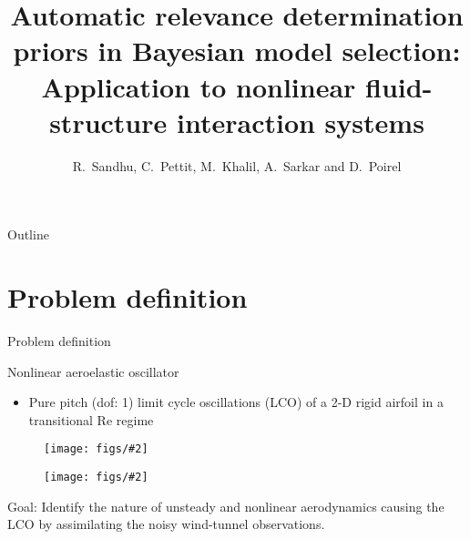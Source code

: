 \documentclass[xcolor=dvipsnames,10pt]{beamer}
\title[EMI 2018]{\normalsize Automatic relevance determination priors in Bayesian model selection: Application to nonlinear fluid-structure interaction systems}
\author[R.~Sandhu \textit{et al.}] %
{\normalsize R.~Sandhu\inst{1}, C.~Pettit\inst{2}, M.~Khalil\inst{1,3},  A.~Sarkar\inst{1} and D.~Poirel\inst{4}}
\institute[] %
{
  \inst{1}%
  Carleton University, Ottawa, ON, Canada
      \and
  \inst{2}%
  United States Naval Academy, Annapolis, MD, USA
    \and
    \inst{3}%
Sandia National Laboratories, Livermore, CA, USA
  \and
  \inst{4}%
  Royal Military College of Canada, Kingston, ON, Canada

\vspace{0.02in}

  }
\date[May 29 - June 1, 2018] %
{{\begin{center}\footnotesize EMI 2018 \\
Boston, MA, USA \\
May 29 - June 1, 2018\end{center}}
{\tiny \it 
Sandia National Laboratories is a multimission laboratory managed and operated by National Technology and Engineering Solutions of Sandia, LLC., a wholly owned subsidiary of Honeywell International, Inc., for the U.S. Department of Energy's National Nuclear Security Administration under contract DE-NA-0003525.
}}
\def\th{\ensuremath{\theta}}
\newcommand{\newfigure}[2]{\begin{figure}\centering 
\texttt{[image: figs/\#2]}\end{figure}\vspace{-0.2in}}
\newenvironment{newblockc}[1]
{\begin{block}{#1}\begin{itemize}\small
  \setlength{\itemsep}{4pt}}
{\end{itemize}\end{block}}
\newcommand{\itb}[1]{\item #1}
\begin{document}
\begin{frame}[plain]
\titlepage
\end{frame}


\begin{frame}{Outline}
  \tableofcontents
\end{frame}


\section{Problem definition}


\begin{frame}{Problem definition}
\begin{minipage}[b]{0.48\linewidth}\begin{newblockc}{Nonlinear aeroelastic oscillator}
\itb{Pure pitch (dof: 1) limit cycle oscillations (LCO) of a 2-D rigid airfoil in a transitional Re regime}
\end{newblockc}
\end{minipage}
\begin{minipage}[b]{0.48\linewidth}
\newfigure{0.9}{wing.eps}
\end{minipage}
\newfigure{0.85}{raw_8p5.eps} \vspace{0.2in}
Goal: Identify the nature of unsteady and nonlinear aerodynamics causing the LCO by assimilating the noisy wind-tunnel observations.
\end{frame}
\end{document}

